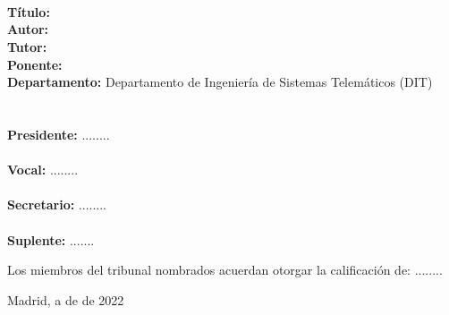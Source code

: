 
\newpage
  \thispagestyle{empty}

\orangebox{\large\textbf{\grado}} \\
	\\

         \\
	\textbf{Título:} \titulomin \\
	\textbf{Autor:} \autormin \\
	\textbf{Tutor:} \tutormin \\
        \textbf{Ponente:} \ponente \\
	\textbf{Departamento:} Departamento de Ingeniería de Sistemas Telemáticos (DIT) \\ \\
         \\
	\textbf{Presidente:} ........ \\\\
	\textbf{Vocal:} ........ \\\\
	\textbf{Secretario:} ........ \\\\
	\textbf{Suplente:} .......

	\vspace{1in}
	Los miembros del tribunal nombrados acuerdan otorgar la calificación de: ........ \\
	\vspace{.5in}
	\begin{flushright}
		Madrid, a \hspace{.5in} de \hspace{1.5in} de 2022
	\end{flushright}

\afterpage{\blankpage}

